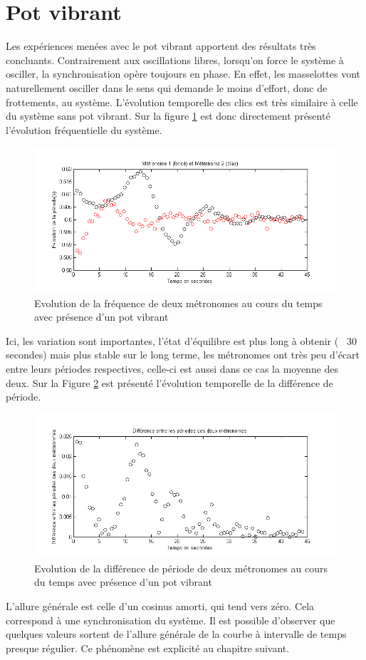 \documentclass[a4paper,11pt]{report}
\begin{document}
\section{Pot vibrant}
Les expériences menées avec le pot vibrant apportent des résultats très concluants. Contrairement aux oscillations libres, lorsqu'on force le système à osciller, la synchronisation opère toujours en phase. En effet, les masselottes vont naturellement osciller dans le sens qui demande le moins d'effort, donc de frottements, au système. L'évolution temporelle des clics est très similaire à celle du système sans pot vibrant. Sur la figure \ref{SynchroFP} est donc directement présenté l'évolution fréquentielle du système.
\begin{figure}[h]
\centering
\includegraphics[width=1\textwidth]{PotVibrant_Synchro_Frequence_200BPM}
\caption{Evolution de la fréquence de deux métronomes au cours du temps avec présence d'un pot vibrant}
\label{SynchroFP}
\end{figure}
Ici, les variation sont importantes, l'état d'équilibre est plus long à obtenir (~ 30 secondes) mais plus stable sur le long terme, les métronomes ont très peu d'écart entre leurs périodes respectives, celle-ci est aussi dans ce cas la moyenne des deux. Sur la Figure \ref{SynchroPP} est présenté l'évolution temporelle de la différence de période.
\begin{figure}[h]
\centering
\includegraphics[width=1\textwidth]{PotVibrant_Synchro_Periode_200BPM}
\caption{Evolution de la différence de période de deux métronomes au cours du temps avec présence d'un pot vibrant}
\label{SynchroPP}
\end{figure}
L'allure générale est celle d'un cosinus amorti, qui tend vers zéro. Cela correspond à une synchronisation du système. Il est possible d'observer que quelques valeurs sortent de l'allure générale de la courbe à intervalle de temps presque régulier. Ce phénomène est explicité au chapitre suivant.
\end{document}
